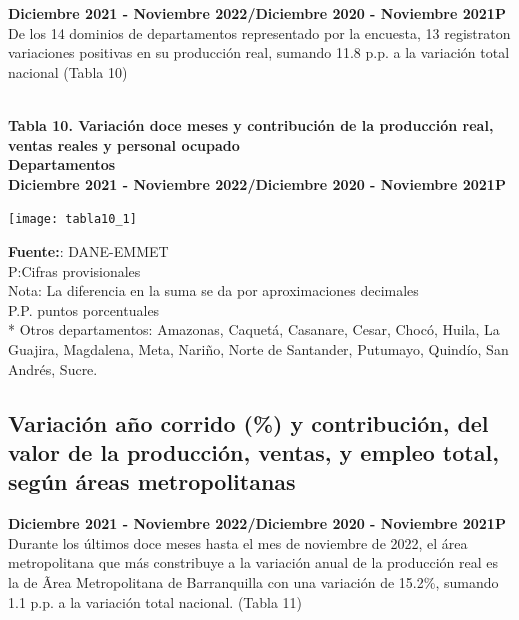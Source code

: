 \documentclass[
]{article}
\begin{document}
\textbf{Diciembre 2021 - Noviembre 2022/Diciembre 2020 - Noviembre
2021P}\\

De los 14 dominios de departamentos representado por la encuesta, 13
registraton variaciones positivas en su producción real, sumando 11.8
p.p. a la variación total nacional (Tabla 10)\\
\strut \\
\textbf{Tabla 10. Variación doce meses y contribución de la producción
real, ventas reales y personal ocupado}\\
\textbf{Departamentos}\\
\textbf{Diciembre 2021 - Noviembre 2022/Diciembre 2020 - Noviembre
2021P}\\

\begin{center}\texttt{[image: tabla10\_1]} \end{center}

\textbf{Fuente:}: DANE-EMMET\\
P:Cifras provisionales\\
Nota: La diferencia en la suma se da por aproximaciones decimales\\
P.P. puntos porcentuales\\
* Otros departamentos: Amazonas, Caquetá, Casanare, Cesar, Chocó, Huila,
La Guajira, Magdalena, Meta, Nariño, Norte de Santander, Putumayo,
Quindío, San Andrés, Sucre.\\

\hypertarget{variaciuxf3n-auxf1o-corrido-y-contribuciuxf3n-del-valor-de-la-producciuxf3n-ventas-y-empleo-total-seguxfan-uxe1reas-metropolitanas-1}{%
\subsection{Variación año corrido (\%) y contribución, del valor de la
producción, ventas, y empleo total, según áreas
metropolitanas}\label{variaciuxf3n-auxf1o-corrido-y-contribuciuxf3n-del-valor-de-la-producciuxf3n-ventas-y-empleo-total-seguxfan-uxe1reas-metropolitanas-1}}

\textbf{Diciembre 2021 - Noviembre 2022/Diciembre 2020 - Noviembre
2021P}\\

Durante los últimos doce meses hasta el mes de noviembre de 2022, el
área metropolitana que más constribuye a la variación anual de la
producción real es la de Ãrea Metropolitana de Barranquilla con una
variación de 15.2\%, sumando 1.1 p.p. a la variación total nacional.
(Tabla 11)\\
\end{document}
